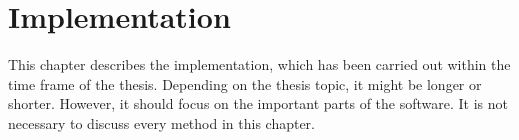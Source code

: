 \chapter{Implementation}
\label{ch:implementation}

This chapter describes the implementation, which has been carried out within the time frame of the thesis. Depending on the thesis topic, it might be longer or shorter. However, it should focus on the important parts of the software. It is not necessary to discuss every method in this chapter.
